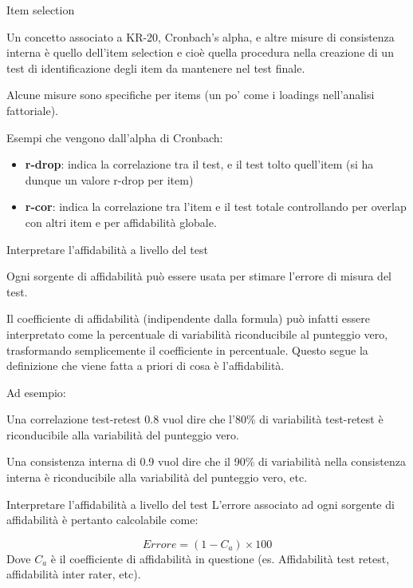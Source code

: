 \documentclass[
  ignorenonframetext,
  aspectratio=169,
]{beamer}
\begin{document}
\begin{frame}{Item selection}
\label{item-selection}
\small

Un concetto associato a KR-20, Cronbach's alpha, e altre misure di
consistenza interna è quello dell'item selection e cioè quella procedura
nella creazione di un test di identificazione degli item da mantenere
nel test finale.

Alcune misure sono specifiche per items (un po' come i loadings
nell'analisi fattoriale).

Esempi che vengono dall'alpha di Cronbach:

\begin{itemize}
\item
  \textbf{r-drop}: indica la correlazione tra il test, e il test tolto
  quell'item (si ha dunque un valore r-drop per item)
\item
  \textbf{r-cor}: indica la correlazione tra l'item e il test totale
  controllando per overlap con altri item e per affidabilità globale.
\end{itemize}
\end{frame}

\begin{frame}{Interpretare l'affidabilità a livello del test}
\label{interpretare-laffidabilituxe0-a-livello-del-test}
\small

Ogni sorgente di affidabilità può essere usata per stimare l'errore di
misura del test.

Il coefficiente di affidabilità (indipendente dalla formula) può infatti
essere interpretato come la percentuale di variabilità riconducibile al
punteggio vero, trasformando semplicemente il coefficiente in
percentuale. Questo segue la definizione che viene fatta a priori di
cosa è l'affidabilità.

Ad esempio:

Una correlazione test-retest 0.8 vuol dire che l'80\% di variabilità
test-retest è riconducibile alla variabilità del punteggio vero.

Una consistenza interna di 0.9 vuol dire che il 90\% di variabilità
nella consistenza interna è riconducibile alla variabilità del punteggio
vero, etc.
\end{frame}

\begin{frame}{Interpretare l'affidabilità a livello del test}
\label{interpretare-laffidabilituxe0-a-livello-del-test-1}
L'errore associato ad ogni sorgente di affidabilità è pertanto
calcolabile come:

\[
Errore = (1-C_a) \times 100
\] Dove \(C_a\) è il coefficiente di affidabilità in questione (es.
Affidabilità test retest, affidabilità inter rater, etc).
\end{frame}
\end{document}
